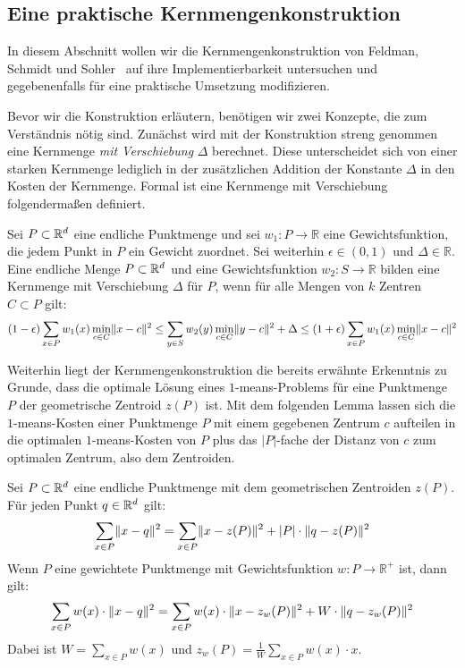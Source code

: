 \subsection{Eine praktische Kernmengenkonstruktion}

In diesem Abschnitt wollen wir die Kernmengenkonstruktion von Feldman, Schmidt und Sohler~\cite{FeldmanSS13,Schmidt14} auf ihre
Implementierbarkeit untersuchen und gegebenenfalls für eine praktische Umsetzung modifizieren.

Bevor wir die Konstruktion erläutern, benötigen wir zwei Konzepte, die zum Verständnis nötig sind. Zunächst wird mit der
Konstruktion streng genommen eine Kernmenge \emph{mit Verschiebung} $\Delta$ berechnet. Diese unterscheidet sich von einer
starken Kernmenge lediglich in der zusätzlichen Addition der Konstante $\Delta$ in den Kosten der Kernmenge.
Formal ist eine Kernmenge mit Verschiebung folgendermaßen definiert.

\begin{definition}
\label{def:coreset-with-offset}
	Sei $P \subset \mathbb{R}^{d}$ eine endliche Punktmenge und sei $w_1 : P \rightarrow \mathbb{R}$ eine Gewichtsfunktion, die jedem
	Punkt in $P$ ein Gewicht zuordnet. Sei weiterhin $\epsilon \in (0,1)$ und $\Delta \in \mathbb{R}$.
	Eine endliche Menge $P \subset \mathbb{R}^{d}$ und eine
	Gewichtsfunktion $w_2 : S \rightarrow \mathbb{R}$ bilden eine Kernmenge mit Verschiebung $\Delta$ für $P$, wenn
	für alle Mengen von $k$ Zentren $C \subset P$ gilt:
	\[ (1-\epsilon) \sum_{x \in P} w_1(x) \min_{c \in C} \lVert {x} - {c} \rVert^2 
		\leq \sum_{y \in S} w_2(y) \min_{c \in C} \lVert {y} - {c} \rVert^2 + \Delta
		\leq  (1+\epsilon) \sum_{x \in P} w_1(x) \min_{c \in C} \lVert {x} - {c} \rVert^2 \]
\end{definition}

Weiterhin liegt der Kernmengenkonstruktion die bereits erwähnte Erkenntnis zu Grunde, dass die optimale Lösung eines
$1$-means-Problems für eine Punktmenge $P$ der geometrische Zentroid $z(P)$ ist. Mit dem folgenden Lemma lassen sich die
$1$-means-Kosten einer Punktmenge $P$ mit einem gegebenen Zentrum $c$ aufteilen in die optimalen $1$-means-Kosten von $P$
plus das $\left|P\right|$-fache der Distanz von $c$ zum optimalen Zentrum, also dem Zentroiden.

\begin{lemma}
\label{lemma:1-means-cost-parts}
	Sei $P \subset \mathbb{R}^{d}$ eine endliche Punktmenge mit dem geometrischen Zentroiden $z(P)$. Für jeden Punkt $q \in \mathbb{R}^{d}$ gilt:
	\[ \sum_{x \in P} \lVert {x} - {q} \rVert^2 = \sum_{x \in P} \lVert {x} - {z(P)} \rVert^2 + \left|P\right| \cdot \lVert {q} - {z(P)} \rVert^2
	 \]
	 Wenn $P$ eine gewichtete Punktmenge mit Gewichtsfunktion $w : P \rightarrow \mathbb{R}^+$ ist, dann gilt:
	 \[ \sum_{x \in P} w(x) \cdot \lVert {x} - {q} \rVert^2 = \sum_{x \in P} w(x) \cdot \lVert {x} - {z_w(P)} \rVert^2 +
	 	W \cdot \lVert {q} - {z_w(P)} \rVert^2 \]
	 Dabei ist $W = \sum_{x \in P} w(x)$ und $z_w(P) = \frac{1}{W} \sum_{x \in P} w(x) \cdot x$.
\end{lemma}

